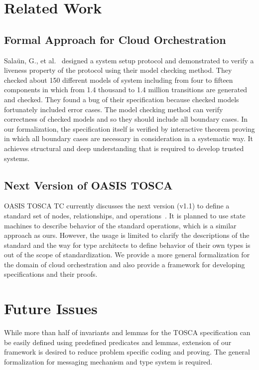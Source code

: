 \documentclass[12pt]{report}
\begin{document}
\section{Related Work}
\subsection{Formal Approach for Cloud Orchestration}
Sala{\"u}n, G., et
al.~\cite{EtcheversCBP11,SalaunBCPEG13,SalaunEPBC13} designed a system
setup protocol and demonstrated to verify a liveness property of the
protocol using their model checking method. They checked about 150
different models of system including from four to fifteen components
in which from 1.4 thousand to 1.4 million transitions are generated
and checked. They found a bug of their specification because checked
models fortunately included error cases. The model checking method can
verify correctness of checked models and so they should include all
boundary cases. In our formalization, the specification itself is
verified by interactive theorem proving in which all boundary cases
are necessary in consideration in a systematic way. It achieves
structural and deep understanding that is required to develop trusted
systems.

\subsection{Next Version of OASIS TOSCA}
OASIS TOSCA TC currently discusses the next version (v1.1) to define a
standard set of nodes, relationships, and
operations~\cite{TOSCAYAML}. It is planned to use state machines to
describe behavior of the standard operations, which is a similar
approach as ours. However, the usage is limited to clarify the
descriptions of the standard and the way for type architects to define
behavior of their own types is out of the scope of standardization. We
provide a more general formalization for the domain of cloud
orchestration and also provide a framework for developing
specifications and their proofs.

\section{Future Issues}
While more than half of invariants and lemmas for the TOSCA
specification can be easily defined using predefined predicates and
lemmas, extension of our framework is desired to reduce problem
specific coding and proving. The general formalization for messaging
mechanism and type system is required.
\end{document}
